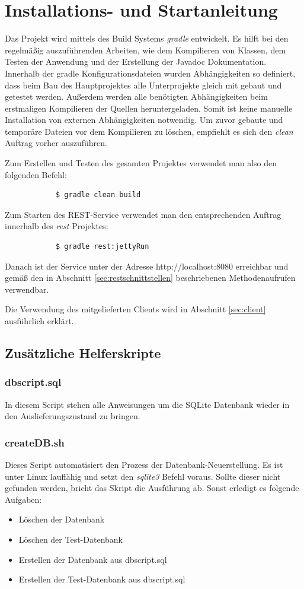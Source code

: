 \documentclass[12pt]{scrartcl}
\begin{document}
	\section{Installations- und Startanleitung}
		Das Projekt wird mittels des Build Systems \emph{gradle} entwickelt. Es hilft bei den regelmäßig auszuführenden Arbeiten, wie dem Kompilieren von Klassen, dem Testen der Anwendung und der Erstellung der Javadoc Dokumentation. Innerhalb der gradle Konfigurationsdateien wurden Abhängigkeiten so definiert, dass beim Bau des Hauptprojektes alle Unterprojekte gleich mit gebaut und getestet werden. Außerdem werden alle benötigten Abhängigkeiten beim erstmaligen Kompilieren der Quellen heruntergeladen. Somit ist keine manuelle Installation von externen Abhängigkeiten notwendig. Um zuvor gebaute und temporäre Dateien vor dem Kompilieren zu löschen, empfiehlt es sich den \emph{clean} Auftrag vorher auszuführen.
				
		Zum Erstellen und Testen des gesamten Projektes verwendet man also den folgenden Befehl:
		\begin{verbatim}
			$ gradle clean build
		\end{verbatim}
		
		Zum Starten des REST-Service verwendet man den entsprechenden Auftrag innerhalb des \emph{rest} Projektes:
		\begin{verbatim}
			$ gradle rest:jettyRun
		\end{verbatim}
		
		Danach ist der Service unter der Adresse http://localhost:8080 erreichbar und gemäß den in Abschnitt \ref{sec:restschnittstellen} beschriebenen Methodenaufrufen verwendbar.
		
		Die Verwendung des mitgelieferten Clients wird in Abschnitt \ref{sec:client} ausführlich erklärt.
		
		\subsection{Zusätzliche Helferskripte}
			\subsubsection{dbscript.sql}
				In diesem Script stehen alle Anweisungen um die SQLite Datenbank wieder in den Auslieferungszustand zu bringen.
			\subsubsection{createDB.sh}
				Dieses Script automatisiert den Prozess der Datenbank-Neuerstellung. Es ist unter Linux lauffähig und setzt den \emph{sqlite3} Befehl voraus. Sollte dieser nicht gefunden werden, bricht das Skript die Ausführung ab.
				Sonst erledigt es folgende Aufgaben:
				\begin{itemize}
					\item Löschen der Datenbank
					\item Löschen der Test-Datenbank
					\item Erstellen der Datenbank aus dbscript.sql
					\item Erstellen der Test-Datenbank aus dbscript.sql
				\end{itemize}
\end{document}
